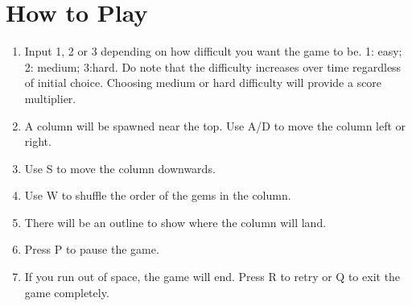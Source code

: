 \documentclass{article}
\begin{document}



\section{How to Play}
\begin{enumerate}
    \item Input 1, 2 or 3 depending on how difficult you want the game to be. 1: easy; 2: medium; 3:hard. Do note that the difficulty increases over time regardless of initial choice. Choosing medium or hard difficulty will provide a score multiplier.
    \item A column will be spawned near the top. Use A/D to move the column left or right. 
    \item Use S to move the column downwards.
    \item Use W to shuffle the order of the gems in the column.
    \item There will be an outline to show where the column will land.
    \item Press P to pause the game.
    \item If you run out of space, the game will end. Press R to retry or Q to exit the game completely.
\end{enumerate}
\end{document}
